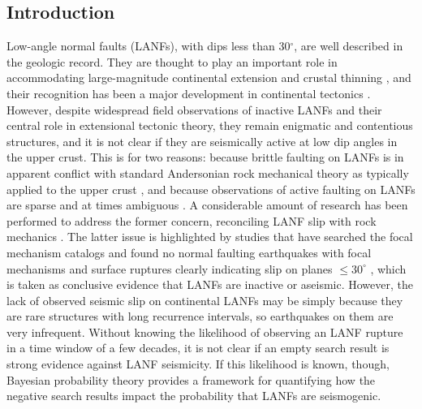 \documentclass[draft,grl]{AGUTeX}
\begin{document}
\begin{article}

\section{Introduction}
Low-angle normal faults (LANFs), with dips less than 30$^\circ$, are well
described in the geologic record. They are thought to play an important role in
accommodating large-magnitude continental extension \citep{howard1987crustal}
and crustal thinning \citep{lister1986detachment}, and their recognition has
been a major development in continental tectonics
\citep{wernicke2009detachment}. However, despite widespread field observations
of inactive LANFs and their central role in extensional tectonic theory, they
remain enigmatic and contentious structures, and it is not clear if they are
seismically active at low dip angles in the upper crust. This is for two
reasons: because brittle faulting on LANFs is in apparent conflict with
standard Andersonian rock mechanical theory as typically applied to the upper
crust \citep{axen2004lanfmech}, and because observations of active faulting on
LANFs are sparse and at times ambiguous \citep{wernicke1995seis}.
A considerable amount of research has been performed to address the former
concern, reconciling LANF slip with rock mechanics \citep [e.g.,]
[]{axenbartley1997, collettini2011lanfmech}.  The latter issue is highlighted
by studies that have searched the focal mechanism catalogs and found no normal
faulting earthquakes with focal mechanisms and surface ruptures clearly
indicating slip on planes $\le30^\circ$ \citep{jackson1987,
collettinisibson2001}, which is taken as conclusive evidence that LANFs are
inactive or aseismic.  However, the lack of observed seismic slip on
continental LANFs may be simply because they are rare structures with long
recurrence intervals, so earthquakes on them are very infrequent. Without
knowing the likelihood of observing an LANF rupture in a time window of a few
decades, it is not clear if an empty search result is strong evidence against
LANF seismicity. If this likelihood is known, though, Bayesian probability
theory provides a framework for quantifying how the negative search results
impact the probability that LANFs are seismogenic.


\end{article}
\end{document}
